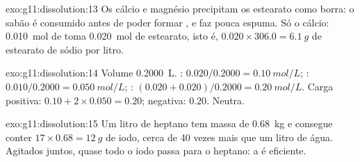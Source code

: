 \begin{solution}{exo:g11:dissolution:13}
Os  cálcio e magnésio precipitam os  estearato como borra: o
sabão é consumido antes de poder formar , e faz pouca espuma.
Só o cálcio: \qty{0.010}{mol} de  toma
\qty{0.020}{mol} de estearato, isto é, $0.020 \times 306.0 =
\qty{6.1}{g}$ de estearato de sódio por litro.
\end{solution}

\begin{solution}{exo:g11:dissolution:14}
Volume \qty{0.2000}{L}. : $0.020 / 0.2000 = \qty{0.10}{mol/L}$;
: $0.010 / 0.2000 = \qty{0.050}{mol/L}$; :
$(0.020 + 0.020) / 0.2000 = \qty{0.20}{mol/L}$. Carga positiva:
$0.10 + 2 \times 0.050 = 0.20$; negativa: $0.20$. Neutra.
\end{solution}

\begin{solution}{exo:g11:dissolution:15}
Um litro de heptano tem massa de \qty{0.68}{kg} e consegue conter
$17 \times 0.68 = \qty{12}{g}$ de iodo, cerca de 40 vezes mais que um
litro de água. Agitados juntos, quase todo o iodo passa para o heptano:
a  é eficiente.
\end{solution}

